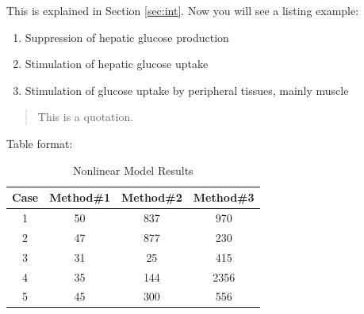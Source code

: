 	\label{sec:int}
	
	This is explained in Section \ref{sec:int}. Now you will see a listing example:
	\begin{enumerate}
	  \item Suppression of hepatic glucose production
	  \item Stimulation of hepatic glucose uptake
	  \item Stimulation of glucose uptake by peripheral tissues,
	  mainly muscle
	\end{enumerate}
	
	\begin{quotation}
	This is a quotation. \cite{HK}
	\end{quotation}
	
	
	
	Table format:
	\begin{table}[ht]
		\caption{Nonlinear Model Results}   %
		\centering                          %
		\begin{tabular}{c c c c}            %
		\hline\hline                        %
		Case & Method\#1 & Method\#2 & Method\#3 \\ [0.5ex] %
		\hline                              %
		1 & 50 & 837 & 970  \\              %
		2 & 47 & 877 & 230  \\
		3 & 31 & 25  & 415  \\
		4 & 35 & 144 & 2356 \\
		5 & 45 & 300 & 556 \\ [1ex]         %
		\hline                              %
		\end{tabular}
		\label{table:nonlin}                %
	\end{table}

